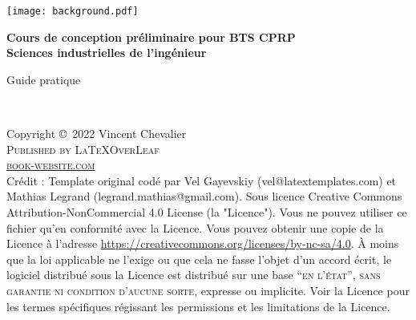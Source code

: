 \documentclass[
	11pt, %
	fleqn, %
	a4paper, %
]{LegrandOrangeBook}
\begin{document}

\titlepage %
	{\texttt{[image: background.pdf]}} %
	{ %
		\centering\sffamily %
		{\Huge\bfseries Cours de conception préliminaire pour BTS CPRP\\ Sciences industrielles de l'ingénieur\par} %
		\vspace{16pt} %
		{\LARGE Guide pratique\par} %
		\vspace{24pt} %
		{\huge\bfseries \par} %
	}


\thispagestyle{empty} %

~\vfill %

\noindent Copyright \copyright\ 2022 Vincent Chevalier\\ %

\noindent \textsc{Published by \LaTeX OverLeaf}\\ %

\noindent \textsc{\href{https://www.latextemplates.com/template/legrand-orange-book}{book-website.com}}\\ %
\noindent
Crédit : Template original codé par Vel Gayevskiy (vel@latextemplates.com) et Mathias Legrand (legrand.mathias@gmail.com). Sous licence Creative Commons Attribution-NonCommercial 4.0 License (la "Licence"). Vous ne pouvez utiliser ce fichier qu'en conformité avec la Licence. Vous pouvez obtenir une copie de la Licence à l'adresse  \url{https://creativecommons.org/licenses/by-nc-sa/4.0}. À moins que la loi applicable ne l'exige ou que cela ne fasse l'objet d'un accord écrit, le logiciel distribué sous la Licence est distribué sur une base \textsc{``en l'état'', sans garantie ni condition d'aucune sorte}, expresse ou implicite. Voir la Licence pour les termes spécifiques régissant les permissions et les limitations de la Licence.\\ %
\end{document}
